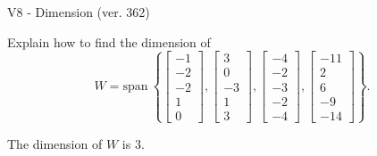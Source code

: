 \begin{exercise}
  \begin{exerciseTitle}V8 - Dimension (ver. 362)\end{exerciseTitle}
  \begin{exerciseStatement}
    Explain how to find the dimension of 
\[W=\mathrm{span}\ \left\{\left[\begin{array}{r}
-1 \\
-2 \\
-2 \\
1 \\
0
\end{array}\right] , \left[\begin{array}{r}
3 \\
0 \\
-3 \\
1 \\
3
\end{array}\right] , \left[\begin{array}{r}
-4 \\
-2 \\
-3 \\
-2 \\
-4
\end{array}\right] , \left[\begin{array}{r}
-11 \\
2 \\
6 \\
-9 \\
-14
\end{array}\right]\right\}.\]



  \end{exerciseStatement}
  \begin{exerciseAnswer}
   The dimension of \(W\) is  \(3\).
  


  \end{exerciseAnswer}
\end{exercise}